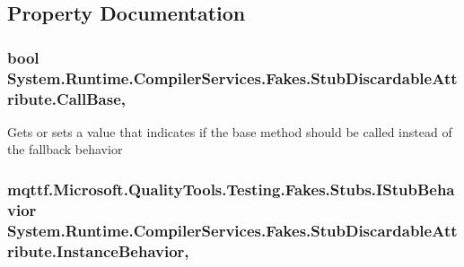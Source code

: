 \subsection{Property Documentation}
\hypertarget{class_system_1_1_runtime_1_1_compiler_services_1_1_fakes_1_1_stub_discardable_attribute_a2840be0ad3a49e7181ba222d3c6c72d2}{
\subsubsection[{Call\-Base}]{\setlength{\rightskip}{0pt plus 5cm}bool System.\-Runtime.\-Compiler\-Services.\-Fakes.\-Stub\-Discardable\-Attribute.\-Call\-Base\hspace{0.3cm}{\ttfamily [get]}, {\ttfamily [set]}}}\label{class_system_1_1_runtime_1_1_compiler_services_1_1_fakes_1_1_stub_discardable_attribute_a2840be0ad3a49e7181ba222d3c6c72d2}


Gets or sets a value that indicates if the base method should be called instead of the fallback behavior

\hypertarget{class_system_1_1_runtime_1_1_compiler_services_1_1_fakes_1_1_stub_discardable_attribute_a80687dbe674bc925493beb7caa3a8380}{
\subsubsection[{Instance\-Behavior}]{\setlength{\rightskip}{0pt plus 5cm}mqttf.\-Microsoft.\-Quality\-Tools.\-Testing.\-Fakes.\-Stubs.\-I\-Stub\-Behavior System.\-Runtime.\-Compiler\-Services.\-Fakes.\-Stub\-Discardable\-Attribute.\-Instance\-Behavior\hspace{0.3cm}{\ttfamily [get]}, {\ttfamily [set]}}}\label{class_system_1_1_runtime_1_1_compiler_services_1_1_fakes_1_1_stub_discardable_attribute_a80687dbe674bc925493beb7caa3a8380}



